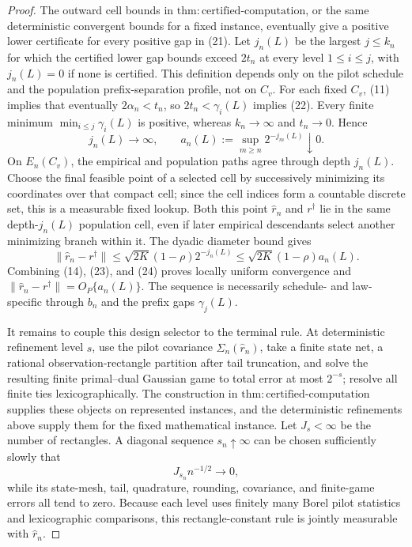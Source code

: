 \documentclass{article}
\begin{document}
\begin{proof}
The outward cell bounds in \(\mathrm{thm:certified\text{-}computation}\), or the same deterministic convergent bounds for a fixed instance, eventually give a positive lower certificate for every positive gap in (21). Let \(j_n(L)\) be the largest \(j\le k_n\) for which the certified lower gap bounds exceed \(2t_n\) at every level \(1\le i\le j\), with \(j_n(L)=0\) if none is certified. This definition depends only on the pilot schedule and the population prefix-separation profile, not on \(C_v\). For each fixed \(C_v\), (11) implies that eventually \(2\alpha_n<t_n\), so \(2t_n<\gamma_i(L)\) implies (22). Every finite minimum \(\min_{i\le j}\gamma_i(L)\) is positive, whereas \(k_n\to\infty\) and \(t_n\to0\). Hence
\[
j_n(L)\to\infty,
\qquad
a_n(L):=\sup_{m\ge n}2^{-j_m(L)}\downarrow0.
\tag{23}
\]
On \(E_n(C_v)\), the empirical and population paths agree through depth \(j_n(L)\). Choose the final feasible point of a selected cell by successively minimizing its coordinates over that compact cell; since the cell indices form a countable discrete set, this is a measurable fixed lookup. Both this point \(\widehat r_n\) and \(r^\dagger\) lie in the same depth-\(j_n(L)\) population cell, even if later empirical descendants select another minimizing branch within it. The dyadic diameter bound gives
\[
\lVert\widehat r_n-r^\dagger\rVert
\le\sqrt{2K}(1-\rho)2^{-j_n(L)}
\le\sqrt{2K}(1-\rho)a_n(L).
\tag{24}
\]
Combining (14), (23), and (24) proves locally uniform convergence and \(\lVert\widehat r_n-r^\dagger\rVert=O_P\{a_n(L)\}\). The sequence is necessarily schedule- and law-specific through \(b_n\) and the prefix gaps \(\gamma_j(L)\).

It remains to couple this design selector to the terminal rule. At deterministic refinement level \(s\), use the pilot covariance \(\widehat\Sigma_n(\widehat r_n)\), take a finite state net, a rational observation-rectangle partition after tail truncation, and solve the resulting finite primal--dual Gaussian game to total error at most \(2^{-s}\); resolve all finite ties lexicographically. The construction in \(\mathrm{thm:certified\text{-}computation}\) supplies these objects on represented instances, and the deterministic refinements above supply them for the fixed mathematical instance. Let \(J_s<\infty\) be the number of rectangles. A diagonal sequence \(s_n\uparrow\infty\) can be chosen sufficiently slowly that
\[
J_{s_n}n^{-1/2}\to0,
\tag{25}
\]
while its state-mesh, tail, quadrature, rounding, covariance, and finite-game errors all tend to zero. Because each level uses finitely many Borel pilot statistics and lexicographic comparisons, this rectangle-constant rule is jointly measurable with \(\widehat r_n\).


\end{proof}
\end{document}
